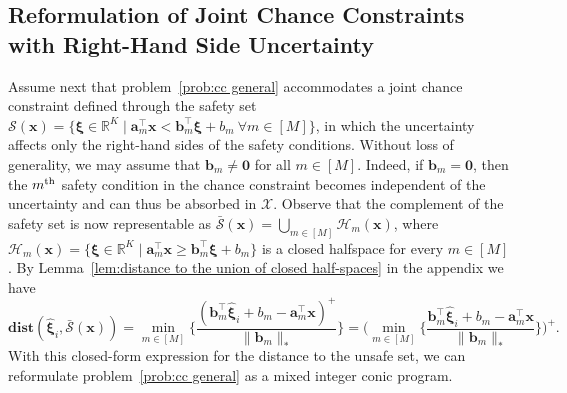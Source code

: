 \documentclass[nonblindrev]{informs2017}
\newcommand{\bmh}[1]{\hat{\bm{#1}}}
\newcommand{\1}[1]{\mathds{1}{\left(#1\right)}}
\begin{document}
\subsection{Reformulation of Joint Chance Constraints with Right-Hand Side Uncertainty}\label{sec:ref_joint_cc}

Assume next that problem~\eqref{prob:cc general} accommodates a joint chance constraint defined through the safety set $\mathcal{S}(\bm{x}) = \{\bm{\xi} \in \mathbb{R}^K \mid \bm{a}^\top_m \bm{x} < \bm{b}^\top_m\bm{\xi} + b_m ~\forall m \in [M]\}$, in which the uncertainty affects only the right-hand sides of the safety conditions. Without loss of generality, we may assume that $\bm{b}_m \ne \bm{0}$ for all $m \in [M]$. Indeed, if $\bm{b}_m = \bm{0}$, then the $m^{\rm th}$ safety condition in the chance constraint becomes independent of the uncertainty and can thus be absorbed in $\mathcal{X}$. Observe that the complement of the safety set is now representable as $\bar{\mathcal{S}}(\bm{x}) = \bigcup_{m \in [M]} \mathcal{H}_m(\bm{x})$, where $\mathcal{H}_m(\bm{x}) = \{\bm{\xi} \in \mathbb{R}^K \mid \bm{a}^\top_m \bm{x} \geq \bm{b}^\top_m\bm{\xi} + b_m\}$ is a closed halfspace for every $m \in [M]$. By Lemma~\ref{lem:distance to the union of closed half-spaces} in the appendix we have
\begin{equation}\label{eq:distance-joint}
\mathbf{dist}(\bmh{\xi}_i, \bar{\mathcal{S}}(\bm{x})) = \min_{m \in [M]} \bigg\{ \dfrac{(\bm{b}^\top_m\bmh{\xi}_i + b_m - \bm{a}^\top_m\bm{x})^+}{\|\bm{b}_m\|_*} \bigg\} = \bigg(\min_{m \in [M]} \bigg\{\dfrac{\bm{b}^\top_m\bmh{\xi}_i + b_m - \bm{a}^\top_m\bm{x}}{\|\bm{b}_m\|_*} \bigg\}\bigg)^+.
\end{equation}
With this closed-form expression for the distance to the unsafe set, we can reformulate problem~\eqref{prob:cc general} as a mixed integer conic program.
\end{document}
